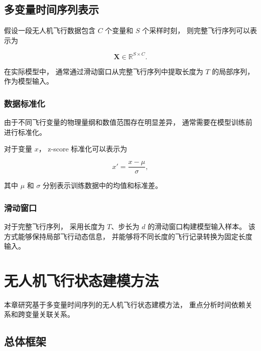 \documentclass[
  degree=master,
  degree-type=academic
]{gzuthesis}
\begin{document}
\section{多变量时间序列表示}

假设一段无人机飞行数据包含 $C$ 个变量和 $S$ 个采样时刻，
则完整飞行序列可以表示为

\begin{equation}
    \mathbf{X}
    \in
    \mathbb{R}^{S \times C}.
\end{equation}

在实际模型中，
通常通过滑动窗口从完整飞行序列中提取长度为 $T$ 的局部序列，
作为模型输入。


\subsection{数据标准化}

由于不同飞行变量的物理量纲和数值范围存在明显差异，
通常需要在模型训练前进行标准化。

对于变量 $x$，
z-score 标准化可以表示为

\begin{equation}
    x'
    =
    \frac{x-\mu}{\sigma},
\end{equation}

其中 $\mu$ 和 $\sigma$ 分别表示训练数据中的均值和标准差。


\subsection{滑动窗口}

对于完整飞行序列，
采用长度为 $T$、步长为 $d$ 的滑动窗口构建模型输入样本。
该方式能够保持局部飞行动态信息，
并能够将不同长度的飞行记录转换为固定长度输入。



\chapter{无人机飞行状态建模方法}

本章研究基于多变量时间序列的无人机飞行状态建模方法，
重点分析时间依赖关系和跨变量关联关系。


\section{总体框架}
\end{document}
